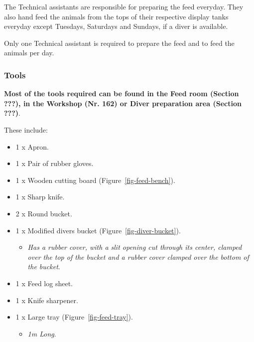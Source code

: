 \documentclass[
  12pt,
]{report}
\providecommand{\tightlist}{%
  \setlength{\itemsep}{0pt}\setlength{\parskip}{0pt}}\usepackage{longtable,booktabs,array}
\begin{document}
The Technical assistants are responsible for preparing the feed
everyday. They also hand feed the animals from the tops of their
respective display tanks everyday except Tuesdays, Saturdays and
Sundays, if a diver is available.

{Only one Technical assistant is required to prepare the feed and to
feed the animals per day}.

\hypertarget{tools}{%
\subsubsection{Tools}\label{tools}}

\textbf{Most of the tools required can be found in the Feed room
(Section ???), in the Workshop (Nr. 162) or Diver preparation area
(Section ???)}.

These include:

\begin{itemize}
\tightlist
\item
  1 x Apron.
\item
  1 x Pair of rubber gloves.
\item
  1 x Wooden cutting board (Figure~\ref{fig-feed-bench}).
\item
  1 x Sharp knife.
\item
  2 x Round bucket.
\item
  1 x Modified divers bucket (Figure~\ref{fig-diver-bucket}).

  \begin{itemize}
  \tightlist
  \item
    \emph{Has a rubber cover, with a slit opening cut through its
    center, clamped over the top of the bucket and a rubber cover
    clamped over the bottom of the bucket}.
  \end{itemize}
\item
  1 x Feed log sheet.
\item
  1 x Knife sharpener.
\item
  1 x Large tray (Figure~\ref{fig-feed-tray}).

  \begin{itemize}
  \tightlist
  \item
    \emph{1m Long}.
  \end{itemize}
\end{itemize}
\end{document}
